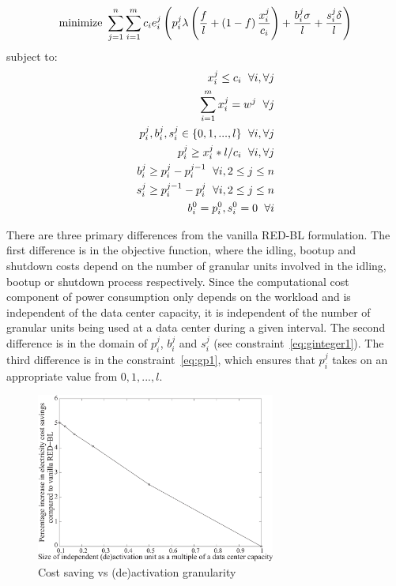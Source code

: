 \begin{align}
\text{minimize } \sum_{j=1}^{n} \sum_{i=1}^{m} c_i e_i^j\left(p_i^j \lambda\left(\frac{f}{l}+\left(1-f\right)\frac{x_i^j}{c_i}\right) + \frac{b_i^j \sigma}{l} + \frac{s_i^j \delta}{l}\right)\notag
\end{align}
subject to:
\begin{align}
x_i^j \le c_i \hspace{6 pt} \forall i, \forall j \label{eq:gcapcon}\\
\sum_{i = 1}^{m} x_i^j = w^j \hspace{6 pt} \forall j \label{eq:gworkcon}\\
p_i^j, b_i^j, s_i^j \in \{0,1,...,l\} \hspace{6 pt} \forall i, \forall j \label{eq:ginteger1}\\
p_i^j \ge x_i^j*l/c_i \hspace{6 pt} \forall i, \forall j \label{eq:gp1}\\
b_i^j \ge p_i^j - p_i^{j-1} \hspace{6 pt} \forall i, 2 \le j \le n \label{eq:gbcon}\\
s_i^j \ge p_i^{j-1} - p_i^j \hspace{6 pt} \forall i, 2 \le j \le n \label{eq:gscon}\\
b_i^0 = p_i^0, s_i^0 = 0 \hspace{6 pt} \forall i \label{eq:gbcon1}
\end{align}

There are three primary differences from the vanilla RED-BL formulation. The first difference is in the objective function, where the idling, bootup and shutdown costs depend on the number of granular units involved in the idling, bootup or shutdown process respectively. Since the computational cost component of power consumption only depends on the workload and is independent of the data center capacity, it is independent of the number of granular units being used at a data center during a given interval. The second difference is in the domain of $p_i^j$, $b_i^j$ and $s_i^j$ (see constraint~\ref{eq:ginteger1}). The third difference is in the constraint~\ref{eq:gp1}, which ensures that $p_i^j$ takes on an appropriate value from $0,1,...,l$.

\begin{figure}
    \centering
    \includegraphics[width=0.7\textwidth]{pics/s6.eps}
\caption{Cost saving vs (de)activation granularity}
\label{fig:granular-deactivation}
\end{figure}

